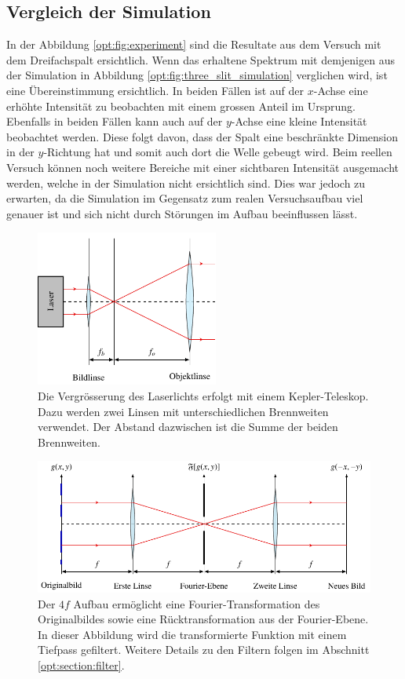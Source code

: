 \subsection{Vergleich der Simulation}
In der Abbildung \ref{opt:fig:experiment} sind die Resultate aus dem Versuch mit dem Dreifachspalt ersichtlich.
Wenn das erhaltene Spektrum mit demjenigen aus der Simulation in Abbildung \ref{opt:fig:three_slit_simulation} verglichen wird, ist eine Übereinstimmung ersichtlich.
In beiden Fällen ist auf der $x$-Achse eine erhöhte Intensität zu beobachten mit einem grossen Anteil im Ursprung.
Ebenfalls in beiden Fällen kann auch auf der $y$-Achse eine kleine Intensität beobachtet werden.
Diese folgt davon, dass der Spalt eine beschränkte Dimension in der $y$-Richtung hat und somit auch dort die Welle gebeugt wird.
Beim reellen Versuch können noch weitere Bereiche mit einer sichtbaren Intensität ausgemacht werden, welche in der Simulation nicht ersichtlich sind.
Dies war jedoch zu erwarten, da die Simulation im Gegensatz zum realen Versuchsaufbau viel genauer ist und sich nicht durch Störungen im Aufbau beeinflussen lässt.


\begin{figure}
    \centering
    \includegraphics[width=60mm]{papers/opt/images/laserAufweiten.pdf}
    \caption{Die Vergrösserung des Laserlichts erfolgt mit einem Kepler-Teleskop.
        Dazu werden zwei Linsen mit unterschiedlichen Brennweiten verwendet.
%
        Der Abstand dazwischen ist die Summe der beiden Brennweiten.}
    \label{opt:fig:laserAufweiten}
\end{figure}

\begin{figure}
    \centering
    \includegraphics[width=\textwidth]{papers/opt/images/4fAufbau.pdf}
    \caption{Der $4f$ Aufbau ermöglicht eine Fourier-Transformation des Originalbildes sowie eine Rücktransformation aus der Fourier-Ebene.
%
    In dieser Abbildung wird die transformierte Funktion mit einem Tiefpass gefiltert.
%
    Weitere Details zu den Filtern folgen im Abschnitt \ref{opt:section:filter}.}
    \label{opt:fig:4fAufbau}
\end{figure}

